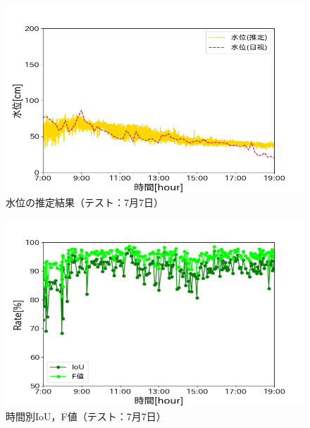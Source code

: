 \begin{figure}[ht] 
  \begin{center}
    \includegraphics[width=\linewidth]{image/0707_kousa.png}
  \end{center}
  \caption{水位の推定結果（テスト：7月7日）}
  \label{kousa_0707}
\end{figure}

\begin{figure}[ht] 
  \begin{center}
    \includegraphics[width=\linewidth]{image/0707_f_IoU.png}
  \end{center}
  \caption{時間別IoU，F値（テスト：7月7日）}
  \label{kousa_IoU_0707}
\end{figure}

